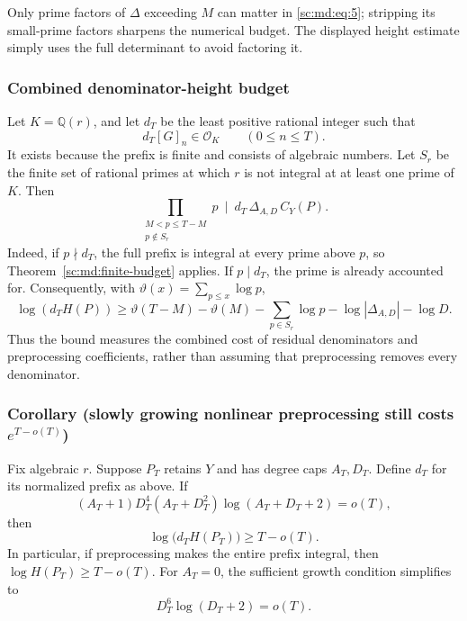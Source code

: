 \documentclass[11pt,a4paper]{article}
\theoremstyle{definition}
\theoremstyle{remark}
\theoremstyle{plain}
\numberwithin{equation}{section}
\begin{document}
Only prime factors of \(\Delta\) exceeding \(M\) can matter in \eqref{sc:md:eq:5};
stripping its small-prime factors sharpens the numerical budget. The
displayed height estimate simply uses the full determinant to avoid
factoring it.

\subsubsection{Combined denominator-height budget}\label{sc:md:corollary-combined-denominator-height-budget}

Let \(K=\mathbb Q(r)\), and let \(d_T\) be the least positive rational
integer such that \[
d_T[G]_n\in\mathcal O_K\qquad(0\le n\le T).
\] It exists because the prefix is finite and consists of algebraic
numbers. Let \(S_r\) be the finite set of rational primes at which \(r\)
is not integral at at least one prime of \(K\). Then \[
\boxed{\prod_{\substack{M<p\le T-M\\p\notin S_r}}p
\ \mid\ d_T\,\Delta_{A,D}\,C_Y(P).}\tag{MD.7}\label{sc:md:eq:7}
\] Indeed, if \(p\nmid d_T\), the full prefix is integral at every prime
above \(p\), so Theorem~\ref{sc:md:finite-budget} applies. If \(p\mid d_T\), the prime is
already accounted for. Consequently, with
\(\vartheta(x)=\sum_{p\le x}\log p\), \[
\boxed{\log(d_T H(P))\ge
\vartheta(T-M)-\vartheta(M)
-\sum_{p\in S_r}\log p
-\log|\Delta_{A,D}|-\log D.}\tag{MD.8}\label{sc:md:eq:8}
\] Thus the bound measures the combined cost of residual denominators
and preprocessing coefficients, rather than assuming that preprocessing
removes every denominator.

\subsubsection{\texorpdfstring{Corollary (slowly growing nonlinear
preprocessing still costs
\(e^{T-o(T)}\))}{Corollary (slowly growing nonlinear preprocessing still costs e\^{}\{T-o(T)\})}}\label{sc:md:corollary-slowly-growing-nonlinear-preprocessing-still-costs-et-ot}

Fix algebraic \(r\). Suppose \(P_T\) retains \(Y\) and has degree caps
\(A_T,D_T\). Define \(d_T\) for its normalized prefix as above. If \[
(A_T+1)D_T^4(A_T+D_T^2)\log(A_T+D_T+2)=o(T),\tag{MD.9}\label{sc:md:eq:9}
\] then \[
\boxed{\log\bigl(d_T H(P_T)\bigr)\ge T-o(T).}\tag{MD.10}\label{sc:md:eq:10}
\] In particular, if preprocessing makes the entire prefix integral,
then \(\log H(P_T)\ge T-o(T)\). For \(A_T=0\), the sufficient growth
condition simplifies to \[
D_T^6\log(D_T+2)=o(T).
\]
\end{document}
